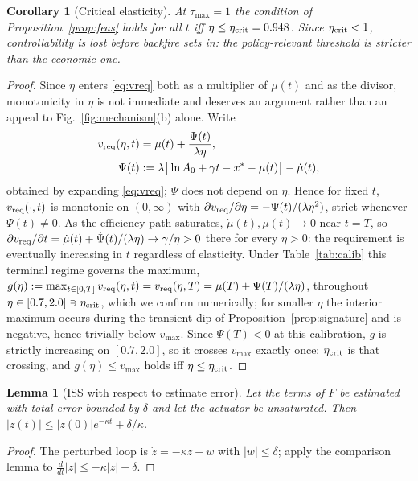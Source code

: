 \documentclass[conference,letterpaper,10pt]{IEEEtran}
\theoremstyle{plain}
\newtheorem{lemma}{Lemma}
\newtheorem{corollary}{Corollary}
\theoremstyle{remark}
\newcommand{\xt}{x^{\ast}}
\newcommand{\mudot}{\dot{\mu}}
\begin{document}
\begin{corollary}[Critical elasticity]
\label{cor:etacrit}
At $\tau_{\max}=1$ the condition of Proposition~\ref{prop:feas} holds
for all $t$ iff $\eta\le\eta_{\rm crit}=0.948$. Since
$\eta_{\rm crit}<1$, controllability is lost \emph{before} backfire
sets in: the policy-relevant threshold is stricter than the economic
one.
\end{corollary}
\begin{proof}
Since $\eta$ enters \eqref{eq:vreq} both as a multiplier of $\mu(t)$
and as the divisor, monotonicity in $\eta$ is not immediate and
deserves an argument rather than an appeal to Fig.~\ref{fig:mechanism}(b)
alone. Write
\begin{equation}
\label{eq:vreq-split}
\begin{aligned}
    v_{\rm req}(\eta,t) &= \mu(t) + \frac{\Psi(t)}{\lambda\eta}, \\
    \Psi(t) &:= \lambda\big[\ln A_0+\gamma t-\xt-\mu(t)\big] - \mudot(t),
\end{aligned}
\end{equation}
obtained by expanding \eqref{eq:vreq}; $\Psi$ does not depend on
$\eta$. Hence for fixed $t$, $v_{\rm req}(\cdot,t)$ is monotonic on
$(0,\infty)$ with $\partial v_{\rm req}/\partial\eta=-\Psi(t)/(\lambda\eta^2)$,
strict whenever $\Psi(t)\neq0$. As the efficiency path saturates,
$\mudot(t),\ddot\mu(t)\to0$ near $t=T$, so
$\partial v_{\rm req}/\partial t=\mudot(t)+\dot\Psi(t)/(\lambda\eta)
\to\gamma/\eta>0$ there for every $\eta>0$: the requirement is
eventually increasing in $t$ regardless of elasticity. Under
Table~\ref{tab:calib} this terminal regime governs the maximum,
$g(\eta):=\max_{t\in[0,T]}v_{\rm req}(\eta,t)=v_{\rm req}(\eta,T)
=\mu(T)+\Psi(T)/(\lambda\eta)$, throughout $\eta\in[0.7,2.0]\ni\eta_{\rm crit}$,
which we confirm numerically; for smaller $\eta$ the interior maximum
occurs during the transient dip of Proposition~\ref{prop:signature}
and is negative, hence trivially below $v_{\max}$. Since
$\Psi(T)<0$ at this calibration, $g$ is strictly increasing on
$[0.7,2.0]$, so it crosses $v_{\max}$ exactly once; $\eta_{\rm crit}$
is that crossing, and $g(\eta)\le v_{\max}$ holds iff
$\eta\le\eta_{\rm crit}$.
\end{proof}

\begin{lemma}[ISS with respect to estimate error]
\label{lem:iss}
Let the terms of $F$ be estimated with total error bounded by $\delta$
and let the actuator be unsaturated. Then
$|z(t)|\le|z(0)|e^{-\kappa t}+\delta/\kappa$.
\end{lemma}
\begin{proof}
The perturbed loop is $\dot z=-\kappa z+w$ with $|w|\le\delta$; apply
the comparison lemma to $\tfrac{d}{dt}|z|\le-\kappa|z|+\delta$.
\end{proof}
\end{document}

